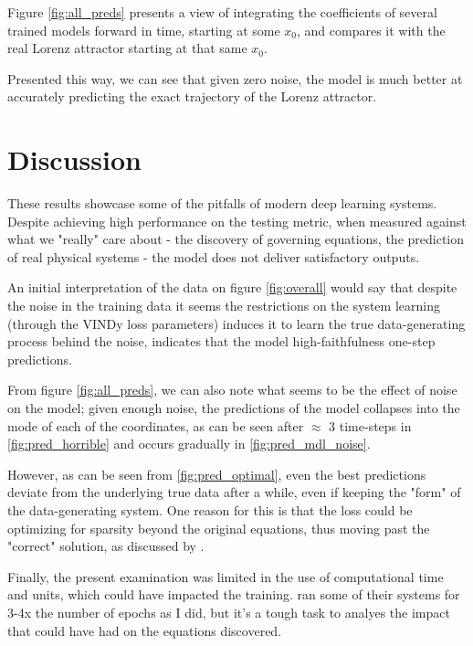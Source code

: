 \documentclass{article}
\begin{document}
Figure \ref{fig:all_preds} presents a view of integrating the coefficients of several trained models forward in time, starting at some $x_0$, and compares it with the real Lorenz attractor starting at that same $x_0$. 

Presented this way, we can see that given zero noise, the model is much better at accurately predicting the exact trajectory of the Lorenz attractor. 


\section{Discussion}
\label{discussion}

These results showcase some of the pitfalls of modern deep learning systems. Despite achieving high performance on the testing metric, when measured against what we "really" care about - the discovery of governing equations, the prediction of real physical systems - the model does not deliver satisfactory outputs.

An initial interpretation of the data on figure \ref{fig:overall} would say that despite the noise in the training data it seems the restrictions on the system learning (through the VINDy loss parameters) induces it to learn the true data-generating process behind the noise, indicates that the model high-faithfulness one-step predictions.

From figure \ref{fig:all_preds}, we can also note what seems to be the effect of noise on the model; given enough noise, the predictions of the model collapses into the mode of each of the coordinates, as can be seen after $\approx$ 3 time-steps in \ref{fig:pred_horrible} and occurs gradually in \ref{fig:pred_mdl_noise}.

However, as can be seen from \ref{fig:pred_optimal}, even the best predictions deviate from the underlying true data after a while, even if keeping the "form" of the data-generating system. One reason for this is that the loss could be optimizing for sparsity beyond the original equations, thus moving past the "correct" solution, as discussed by \citet{bakarjiDiscoveringGoverningEquations2022}.

Finally, the present examination was limited in the use of computational time and units, which could have impacted the training. \citet{bakarjiDiscoveringGoverningEquations2022} ran some of their systems for 3-4x the number of epochs as I did, but it's a tough task to analyes the impact that could have had on the equations discovered. 
\end{document}
